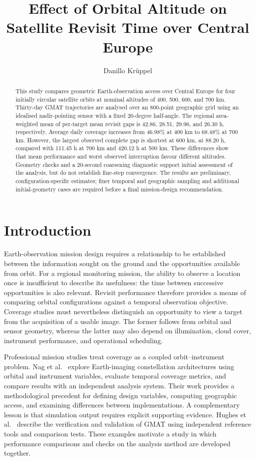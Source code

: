 \documentclass[conf]{new-aiaa}
\title{Effect of Orbital Altitude on Satellite Revisit Time over Central Europe}
\author{Danillo Kr\"uppel}
\affil{Space Systems Engineer, AiShed Consulting}
\begin{document}
\maketitle

\begin{abstract}
This study compares geometric Earth-observation access over Central Europe
for four initially circular satellite orbits at nominal altitudes of 400,
500, 600, and 700 km. Thirty-day GMAT trajectories are analysed over an
800-point geographic grid using an idealised nadir-pointing sensor with a
fixed 20-degree half-angle. The regional area-weighted mean of per-target
mean revisit gaps is 42.86, 28.51, 29.96, and 26.30 h, respectively. Average
daily coverage increases from 46.98\% at 400 km to 68.48\% at 700 km. However,
the largest observed complete gap is shortest at 600 km, at 88.20 h,
compared with 111.45 h at 700 km and 420.12 h at 500 km. These differences
show that mean performance and worst observed interruption favour different
altitudes. Geometry checks and a 20-second coarsening diagnostic support
initial assessment of the analysis, but do not establish fine-step
convergence. The results are preliminary, configuration-specific estimates;
finer temporal and geographic sampling and additional initial-geometry
cases are required before a final mission-design recommendation.
\end{abstract}

\section{Introduction}
\label{sec:introduction}
Earth-observation mission design requires a relationship to be established
between the information sought on the ground and the opportunities available
from orbit. For a regional monitoring mission, the ability to observe a
location once is insufficient to describe its usefulness: the time between
successive opportunities is also relevant. Revisit performance therefore
provides a means of comparing orbital configurations against a temporal
observation objective. Coverage studies must nevertheless distinguish an
opportunity to view a target from the acquisition of a usable image. The
former follows from orbital and sensor geometry, whereas the latter may
also depend on illumination, cloud cover, instrument performance, and
operational scheduling.

Professional mission studies treat coverage as a coupled orbit--instrument
problem. Nag et al.~\cite{nag2016} explore Earth-imaging constellation
architectures using orbital and instrument variables, evaluate temporal
coverage metrics, and compare results with an independent analysis system.
Their work provides a methodological precedent for defining design
variables, computing geographic access, and examining differences between
implementations. A complementary lesson is that simulation output requires
explicit supporting evidence. Hughes et al.~\cite{hughes2014} describe the
verification and validation of GMAT using independent reference tools and
comparison tests. These examples motivate a study in which performance
comparisons and checks on the analysis method are developed together.
\end{document}
